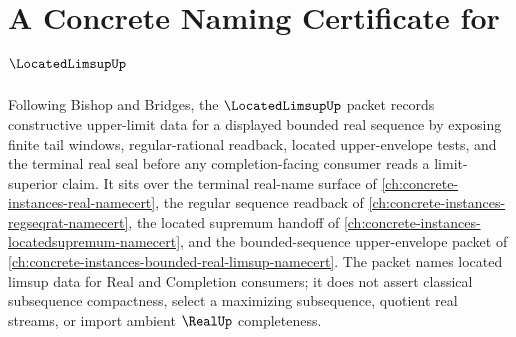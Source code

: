 \chapter{A Concrete Naming Certificate for $\LocatedLimsupUp$}
\label{ch:concrete-instances-located-limsup-namecert}

Following Bishop and Bridges, the $\LocatedLimsupUp$ packet records constructive upper-limit data for a displayed bounded real sequence by exposing finite tail windows, regular-rational readback, located upper-envelope tests, and the terminal real seal before any completion-facing consumer reads a limit-superior claim. It sits over the terminal real-name surface of \autoref{ch:concrete-instances-real-namecert}, the regular sequence readback of \autoref{ch:concrete-instances-regseqrat-namecert}, the located supremum handoff of \autoref{ch:concrete-instances-locatedsupremum-namecert}, and the bounded-sequence upper-envelope packet of \autoref{ch:concrete-instances-bounded-real-limsup-namecert}. The packet names located limsup data for Real and Completion consumers; it does not assert classical subsequence compactness, select a maximizing subsequence, quotient real streams, or import ambient $\RealUp$ completeness.

